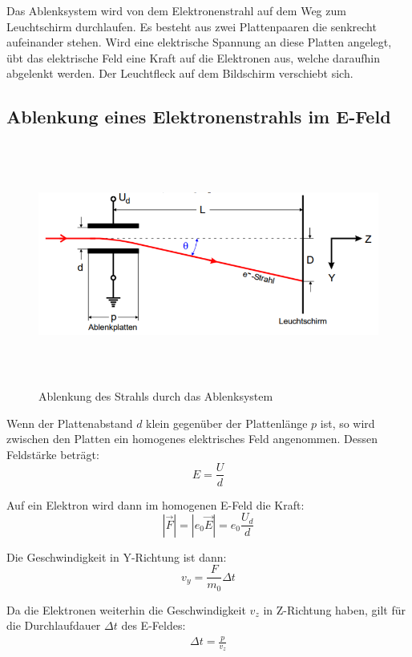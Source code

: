 Das Ablenksystem wird von dem Elektronenstrahl auf dem Weg zum Leuchtschirm durchlaufen. Es besteht aus
zwei Plattenpaaren die senkrecht aufeinander stehen. Wird eine elektrische Spannung an diese Platten angelegt, übt das
elektrische Feld eine Kraft auf die Elektronen aus, welche daraufhin abgelenkt werden.
Der Leuchtfleck auf dem Bildschirm verschiebt sich.

\subsection{Ablenkung eines Elektronenstrahls im E-Feld}

\begin{figure}[H]
  \centering
  \includegraphics[height=8cm]{ablenkungefeld.PNG}
  \caption{Ablenkung des Strahls durch das Ablenksystem}
  \label{fig:ablenkung}
\end{figure}

Wenn der Plattenabstand $d$ klein gegenüber der Plattenlänge $p$ ist, so wird zwischen den Platten
ein homogenes elektrisches Feld angenommen. Dessen Feldstärke beträgt:
\begin{equation}
  E = \frac{U}{d}
\end{equation}

Auf ein Elektron wird dann im homogenen E-Feld die Kraft:
\begin{equation}
  |\vec{F}| = |e_0 \vec{E}| = e_0 \frac{U_d}{d}
\end{equation}

Die Geschwindigkeit in Y-Richtung ist dann:
\begin{equation}
  v_y = \frac{F}{m_0} \Delta t
\end{equation}

Da die Elektronen weiterhin die Geschwindigkeit $v_z$ in Z-Richtung haben, gilt für
die Durchlaufdauer $\Delta t$ des E-Feldes:
\begin{align}
  \Delta t = \frac{p}{v_z}
\end{align}


